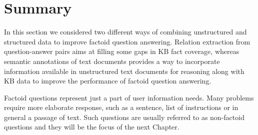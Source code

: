 \section{Summary}
In this section we considered two different ways of combining unstructured and structured data to improve factoid question answering.
Relation extraction from question-answer pairs aims at filling some gaps in KB fact coverage, whereas semantic annotations of text documents provides a way to incorporate information available in unstructured text documents for reasoning along with KB data to improve the performance of factoid question answering.

Factoid questions represent just a part of user information needs. Many problems require more elaborate response, such as a sentence, list of instructions or in general a passage of text.
Such questions are usually referred to as non-factoid questions and they will be the focus of the next Chapter.

\clearpage